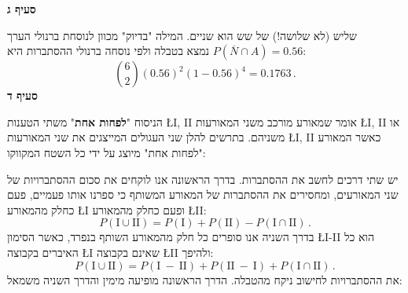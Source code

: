 \smallskip

\textbf{סעיף ג}

שליש (לא שלושה!) של שש הוא שניים. המילה "בדיוק" מכוון לנוסחת
ברנולי הערך
$P(\overline{N}\cap A)=0.56$
נמצא בטבלה ולפי נוסחה ברנולי ההסתברות היא:
\[
{6 \choose 2}(0.56)^2 (1-0.56)^4=0.1763\,.
\]
\textbf{סעיף ד}

הניסוח
"\textbf{לפחות אחת}"
משתי הטענות
\L{I, II}
אומר שמאורע מורכב משני המאורעות
\L{I, II}
או משניהם. בתרשים להלן שני העגולים המייצגים את שני המאורעות
\L{I, II}
כאשר המאורע "לפחות אחת" מיוצג על ידי כל השטח המקווקו:
\begin{center}
\end{center}
יש שתי דרכים לחשב את ההסתברות. בדרך הראשונה אנו לוקחים את סכום ההסתברויות של שני המאורעים, ומחסירים את ההסתברות של המאורע המשותף כי ספרנו אותו פעמיים, פעם כחלק מהמאורע
\L{I}
ופעם כחלק מהמאורע
\L{II}:
\[
P(\textrm{I} \cup \textrm{II}) = P(\textrm{I}) + P(\textrm{II}) - P(\textrm{I} \cap \textrm{II})\,.
\]
בדרך השניה אנו סופרים כל חלק מהמאורע השותף בנפרד, כאשר הסימון
\L{I-II}
הוא כל האיברים בקבוצה 
\L{I}
שאינם בקבוצה
\L{II}
ולהיפך:
\[
P(\textrm{I} \cup \textrm{II}) = P(\textrm{I}\:-\:\textrm{II}) + P(\textrm{II}\:-\:\textrm{I}) + P(\textrm{I} \cap \textrm{II})\,.
\]
את ההסתברויות לחישוב ניקח מהטבלה. הדרך הראשונה מופיעה מימין והדרך השניה משמאל:
